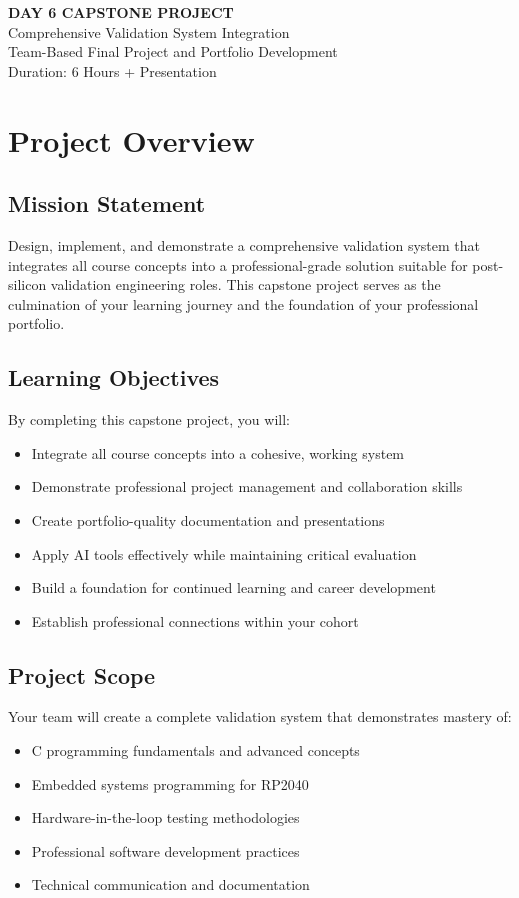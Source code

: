 \documentclass[11pt,a4paper]{article}
\begin{document}
\begin{center}
    {\Huge\bfseries\color{codeblue} DAY 6 CAPSTONE PROJECT}\\[0.5cm]
    {\Large Comprehensive Validation System Integration}\\[0.3cm]
    {\large Team-Based Final Project and Portfolio Development}\\[0.2cm]
    {\normalsize Duration: 6 Hours + Presentation}
\end{center}

\vspace{1cm}

\section{Project Overview}

\subsection{Mission Statement}
Design, implement, and demonstrate a comprehensive validation system that integrates all course concepts into a professional-grade solution suitable for post-silicon validation engineering roles. This capstone project serves as the culmination of your learning journey and the foundation of your professional portfolio.

\subsection{Learning Objectives}
By completing this capstone project, you will:
\begin{itemize}
    \item Integrate all course concepts into a cohesive, working system
    \item Demonstrate professional project management and collaboration skills
    \item Create portfolio-quality documentation and presentations
    \item Apply AI tools effectively while maintaining critical evaluation
    \item Build a foundation for continued learning and career development
    \item Establish professional connections within your cohort
\end{itemize}

\subsection{Project Scope}
Your team will create a complete validation system that demonstrates mastery of:
\begin{itemize}
    \item C programming fundamentals and advanced concepts
    \item Embedded systems programming for RP2040
    \item Hardware-in-the-loop testing methodologies
    \item Professional software development practices
    \item Technical communication and documentation
\end{itemize}
\end{document}
